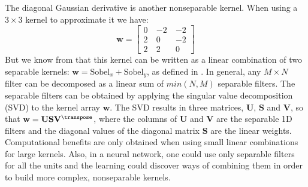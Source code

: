 The diagonal Gaussian derivative is another nonseparable kernel. When using a $3 \times 3$ kernel to approximate it we have: 
\begin{equation}
\mathbf{w} = 
\begin{bmatrix}
  0 ~& -2 ~& -2 \\
  2 ~& 0 ~& -2\\
  2~& 2 ~& 0
\end{bmatrix}
\end{equation}
But we know from \chap{\ref{chapter:image_derivatives}} that this kernel can be written as a linear combination of two separable kernels: $\mathbf{w} = \text{Sobel}_x + \text{Sobel}_y$, as defined in \eqn{\ref{eq:sobel_kernels}}. In general, any $M \times N$ filter can be decomposed as a linear sum of $min(N,M)$ separable filters. The separable filters can be obtained by applying the singular value decomposition (SVD) to the kernel array $\mathbf{w}$. The SVD results in three matrices, $\mathbf{U}$, $\mathbf{S}$ and $\mathbf{V}$, so that $\mathbf{w} = \mathbf{U} \mathbf{S} \mathbf{V}^\transpose$, where the columns of $\mathbf{U}$ and $\mathbf{V}$ are the separable 1D filters and the diagonal values of the diagonal matrix $\mathbf{S}$ are the linear weights. Computational benefits are only obtained when using small linear combinations for large kernels. Also, in a neural network, one could use only separable filters for all the units and the learning could discover ways of combining them in order to build more complex, nonseparable kernels. 



